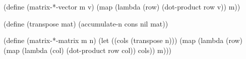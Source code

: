 \begtt\scm
(define (matrix-*-vector m v)
  (map (lambda (row) (dot-product row v)) m))

(define (transpose mat)
  (accumulate-n cons nil mat))

(define (matrix-*-matrix m n)
  (let ((cols (transpose n)))
    (map (lambda (row)
           (map (lambda (col) (dot-product row col))
                cols))
         m)))
\endtt
